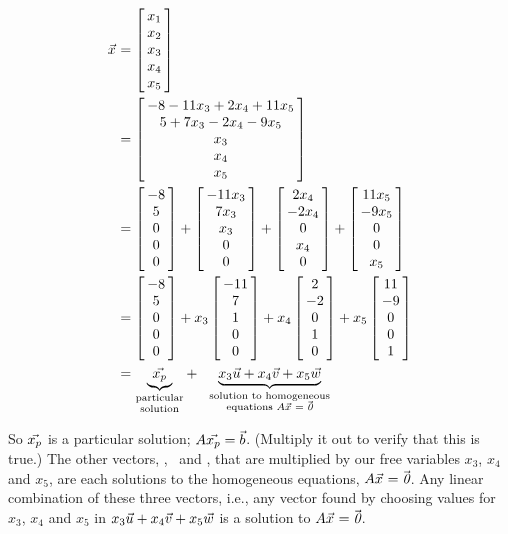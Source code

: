 {\begin{align*}
\vx &= \bmx{c}x_1\\x_2\\x_3\\x_4\\x_5\emx\\
&= \bmx{c}-8-11x_3+2x_4+11x_5\\5+7x_3-2x_4-9x_5\\x_3\\x_4\\x_5\emx\\
&= \bmx{c}-8\\5\\0\\0\\0\emx + \bmx{c}-11x_3\\7x_3\\x_3\\0\\0\emx+ \bmx{c}2x_4\\-2x_4\\0\\x_4\\0\emx + \bmx{c}11x_5\\-9x_5\\0\\0\\x_5\emx \\
&= \bmx{c}-8\\5\\0\\0\\0\emx + x_3\bmx{c}-11\\7\\1\\0\\0\emx+ x_4\bmx{c}2\\-2\\0\\1\\0\emx + x_5\bmx{c}11\\-9\\0\\0\\1\emx \\
&= \underbrace{\vect{x_p}}_{\parbox{35pt}{\center \scriptsize {\vskip -10pt} particular solution}}+ \underbrace{x_3\vu+x_4\vv+x_5\vect{w}}_{\parbox{100pt}{\center \scriptsize {\vskip -10pt} solution to homogeneous equations $\tta\vx=\zero$}}
\end{align*}


So $\vec{x_p}$ is a particular solution; $A\vec{x_p} = \vec{b}$. (Multiply it out to verify that this is true.) The other vectors, \vu, \vv\ and , that are multiplied by our free variables $x_3$, $x_4$ and $x_5$, are each solutions to the homogeneous equations, $A\vec{x_{}}=\vec{\text{\it 0}}$. Any linear combination of these three vectors, i.e., any vector found by choosing values for $x_3$, $x_4$ and $x_5$ in $x_3\vec{u}+x_4\vec{v}+x_5\vec{w}$ is a solution to $A\vec{x_{}}=\vec{\text{\it 0}}$.}\\ %

